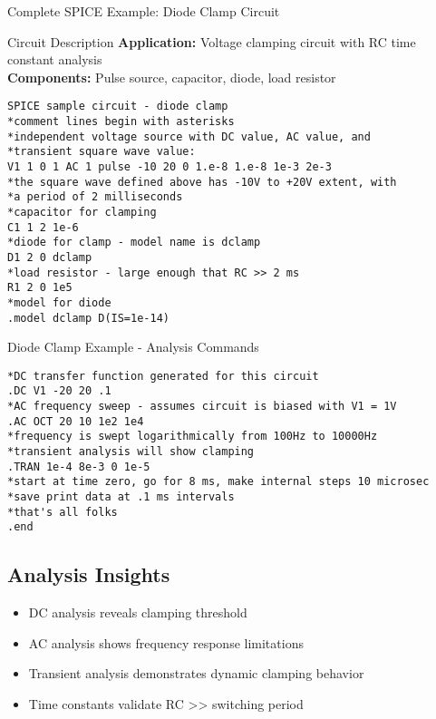 \documentclass{beamer}
\begin{document}
\begin{frame}[fragile]{Complete SPICE Example: Diode Clamp Circuit}
    \begin{alertblock}{Circuit Description}
        \textbf{Application:} Voltage clamping circuit with RC time constant analysis \\
        \textbf{Components:} Pulse source, capacitor, diode, load resistor
    \end{alertblock}
    
    \begin{lstlisting}[fontsize=\tiny]
SPICE sample circuit - diode clamp
*comment lines begin with asterisks
*independent voltage source with DC value, AC value, and
*transient square wave value:
V1 1 0 1 AC 1 pulse -10 20 0 1.e-8 1.e-8 1e-3 2e-3
*the square wave defined above has -10V to +20V extent, with
*a period of 2 milliseconds
*capacitor for clamping
C1 1 2 1e-6
*diode for clamp - model name is dclamp
D1 2 0 dclamp
*load resistor - large enough that RC >> 2 ms
R1 2 0 1e5
*model for diode
.model dclamp D(IS=1e-14)
    \end{lstlisting}
\end{frame}

\begin{frame}[fragile]{Diode Clamp Example - Analysis Commands}
    \begin{lstlisting}[fontsize=\small]
*DC transfer function generated for this circuit
.DC V1 -20 20 .1
*AC frequency sweep - assumes circuit is biased with V1 = 1V
.AC OCT 20 10 1e2 1e4
*frequency is swept logarithmically from 100Hz to 10000Hz
*transient analysis will show clamping
.TRAN 1e-4 8e-3 0 1e-5
*start at time zero, go for 8 ms, make internal steps 10 microsec
*save print data at .1 ms intervals
*that's all folks
.end
    \end{lstlisting}
    
    \subsection{Analysis Insights}
    \begin{itemize}
        \item DC analysis reveals clamping threshold
        \item AC analysis shows frequency response limitations
        \item Transient analysis demonstrates dynamic clamping behavior
        \item Time constants validate RC >> switching period
    \end{itemize}
\end{frame}
\end{document}
